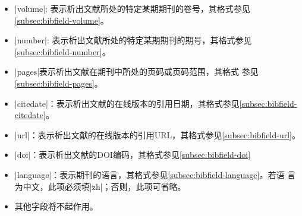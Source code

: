 \begin{itemize}
\item |volume|: 表示析出文献所处的特定某期期刊的卷号，其格式参见\ref{subsec:bibfield-volume}。
\item |number|: 表示析出文献所处的特定某期期刊的期号，其格式参见\ref{subsec:bibfield-number}。
\item |pages|表示析出文献在期刊中所处的页码或页码范围，其格式
  参见\ref{subsec:bibfield-pages}。
\item |citedate|：表示析出文献的在线版本的引用日期，其格式参见\ref{subsec:bibfield-citedate}。
\item |url|：表示析出文献的在线版本的引用URL，其格式参见\ref{subsec:bibfield-url}。
\item |doi|：表示析出文献的DOI编码，其格式参见\ref{subsec:bibfield-doi}
\item |language|：表示期刊的语言，其格式参见\ref{subsec:bibfield-language}。若语
  言为中文，此项必须填|zh|；否则，此项可省略。
\item 其他字段将不起作用。
\end{itemize}